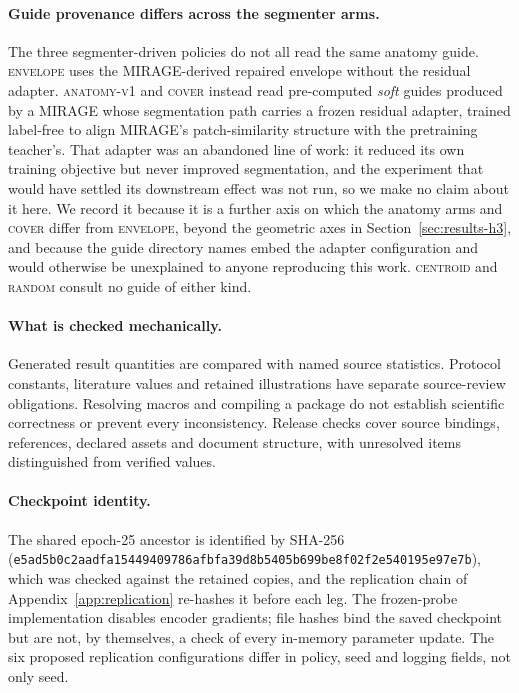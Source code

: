 \documentclass{article}
\newcommand{\ArmBest}{\textsc{centroid}}
\begin{document}
\paragraph{Guide provenance differs across the segmenter arms.} The three
segmenter-driven policies do not all read the same anatomy guide.
\textsc{envelope} uses the MIRAGE-derived repaired envelope without the
residual adapter.
\textsc{anatomy-v1} and \textsc{cover} instead read pre-computed \emph{soft}
guides produced by a MIRAGE whose segmentation path carries a frozen residual
adapter, trained label-free to align MIRAGE's patch-similarity structure with the
pretraining teacher's. That adapter was an abandoned line of work: it reduced
its own training objective but never improved segmentation, and the experiment
that would have settled its downstream effect was not run, so we make no claim
about it here. We record it because it is a further axis on which the anatomy
arms and \textsc{cover} differ from \textsc{envelope}, beyond the geometric axes
in Section~\ref{sec:results-h3}, and because the guide directory names embed the
adapter configuration and would otherwise be unexplained to anyone reproducing
this work. \ArmBest{} and \textsc{random} consult no guide of either kind.

\paragraph{What is checked mechanically.}
Generated result quantities are compared with named source statistics.
Protocol constants, literature values and retained illustrations have separate
source-review obligations. Resolving macros and compiling a package do not
establish scientific correctness or prevent every inconsistency.
Release checks cover source bindings, references, declared assets and
document structure, with unresolved items distinguished from verified values.

\paragraph{Checkpoint identity.} The shared epoch-25 ancestor is identified by
SHA-256
(\texttt{e5ad5b0c2aadfa15449409786afbfa39d8b5405b699be8f02f2e540195e97e7b}),
which was checked against the retained copies, and the replication chain of
Appendix~\ref{app:replication} re-hashes it before each leg.
The frozen-probe implementation disables encoder gradients; file hashes bind
the saved checkpoint but are not, by themselves, a check of every in-memory
parameter update. The six proposed replication configurations differ in policy,
seed and logging fields, not only seed.
\end{document}
